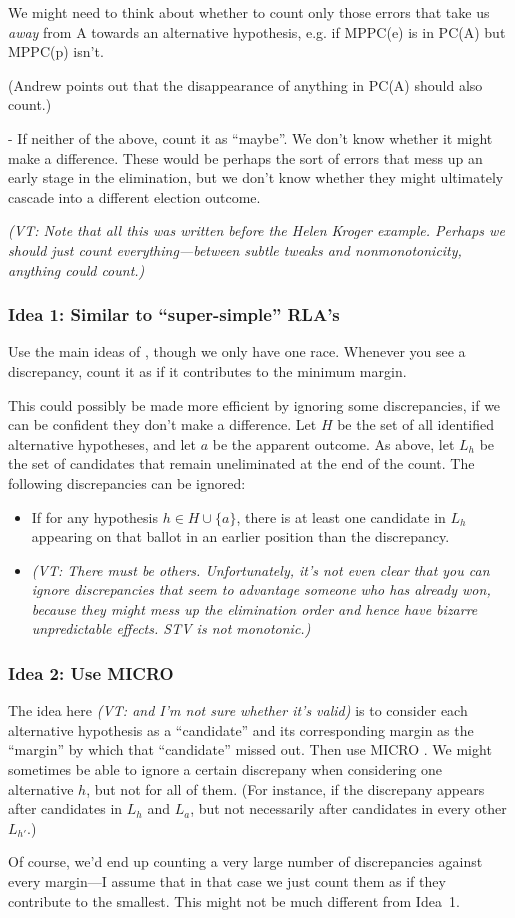 \documentclass[10pt,a4paper]{article}
\newcommand{\VTNote}[1]{{\it(VT: #1)}}
\begin{document}
We might need to think about whether to count only those errors that take us \emph{away} from A towards an alternative hypothesis, e.g. if MPPC(e) is in PC(A) but MPPC(p) isn’t. 

(Andrew points out that the disappearance of anything in PC(A) should also count.)

- If neither of the above, count it as “maybe”.  We don’t know whether it might make a difference.  These would be perhaps the sort of errors that mess up an early stage in the elimination, but we don’t know whether they might ultimately cascade into a different election outcome.

\VTNote{Note that all this was written before the Helen Kroger example.  Perhaps we should just count everything---between subtle tweaks and nonmonotonicity, anything could count.}

\subsubsection{Idea 1: Similar to ``super-simple'' RLA's}
Use the main ideas of \cite{stark2010super}, though we only have one race.  Whenever you see a discrepancy, count it as if it contributes to the minimum margin.

This could possibly be made more efficient by ignoring some discrepancies, if we can be confident they don't make a difference.
Let $H$ be the set of all identified alternative hypotheses, and let $a$ be the apparent outcome.  As above, let $L_h$ be the set of candidates that remain uneliminated at the end of the count.  The following discrepancies can be ignored:
\begin{itemize}
\item If for any hypothesis $h \in H \cup \{a \}$, there is at least one candidate in $L_h$ appearing on that ballot in an earlier position than the discrepancy.
\item \VTNote{There must be others.  Unfortunately, it's not even clear that you can ignore discrepancies that seem to advantage someone who has already won, because they might mess up the elimination order and hence have bizarre unpredictable effects.  STV is not monotonic.}
\end{itemize}



\subsubsection{Idea 2: Use MICRO}
The idea here \VTNote{ and I'm not sure whether it's valid} is to consider each alternative hypothesis as a ``candidate'' and its corresponding margin as the ``margin'' by which that ``candidate'' missed out.  Then use MICRO \cite{stark2008sharper}.  We might sometimes be able to ignore a certain discrepany when considering one alternative $h$, but not for all of them.  (For instance, if the discrepany appears after candidates in $L_h$ and $L_a$, but not necessarily after candidates in every other $L_{h'}$.)  

Of course, we'd end up counting a very large number of discrepancies against every margin---I assume that in that case we just count them as if they contribute to the smallest.  This might not be much different from Idea~1. 



\end{document}
